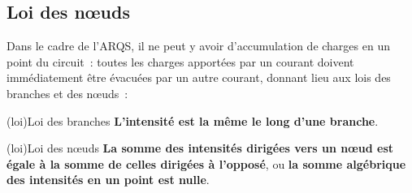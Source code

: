 \documentclass[../../main/main.tex]{subfiles}
\begin{document}
\subsection{Loi des nœuds}

Dans le cadre de l'ARQS, il ne peut y avoir d'accumulation de charges en un
point du circuit~: toutes les charges apportées par un courant doivent
immédiatement être évacuées par un autre courant, donnant lieu aux lois des
branches et des nœuds~:
\begin{tcb}[label=loi:branche, sidebyside, halign upper=center](loi){Loi des branches}
	\textbf{L'intensité est la même le long d'une branche}.
	\tcblower
	\begin{center}
	\end{center}
\end{tcb}
\begin{tcb}[label=loi:noeud, sidebyside, halign upper=center](loi){Loi des nœuds}
	\textbf{La somme des intensités dirigées vers un nœud est égale à la somme de
		celles dirigées à l'opposé}, ou \textbf{la somme algébrique des intensités
		en un point est nulle}.
	\tcblower
	\begin{center}
	\end{center}
\end{tcb}
\end{document}
